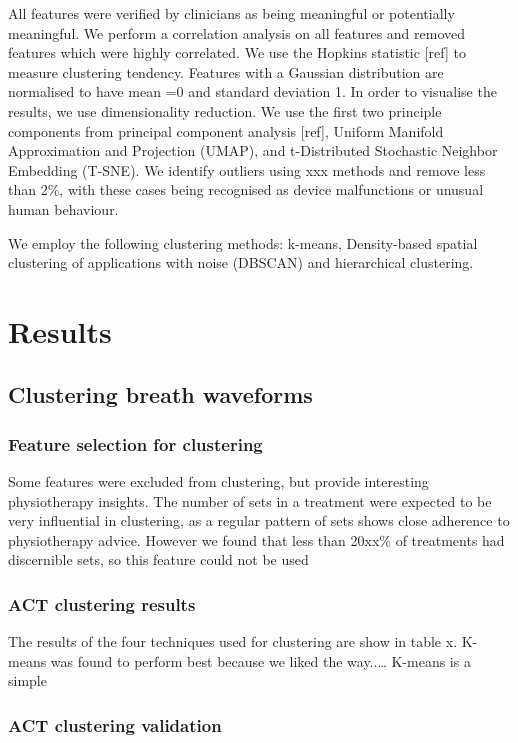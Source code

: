 \documentclass{article}
\begin{document}
All features were verified by clinicians as being meaningful or potentially meaningful. We perform a correlation analysis on all features and removed features which were highly correlated. We use the Hopkins statistic [ref] to measure clustering tendency. Features with a Gaussian distribution are normalised to have mean =0 and standard deviation 1. In order to visualise the results, we use dimensionality reduction. We use the first two principle components from principal component analysis [ref], Uniform Manifold Approximation and Projection (UMAP), and t-Distributed Stochastic Neighbor Embedding (T-SNE). We identify outliers using xxx methods and remove less than 2\%, with these cases being recognised as device malfunctions or unusual human behaviour.  

We employ the following clustering methods: k-means, Density-based spatial clustering of applications with noise (DBSCAN) and hierarchical clustering.  

\section{Results}
\subsection{Clustering breath waveforms}
\subsubsection{Feature selection for clustering}
Some features were excluded from clustering, but provide interesting physiotherapy insights.  
The number of sets in a treatment were expected to be very influential in clustering, as a regular pattern of sets shows close adherence to physiotherapy advice. However we found that less than 20xx\% of treatments had discernible sets, so this feature could not be used


\subsubsection{ACT clustering results}
The results of the four techniques used for clustering are show in table x. K-means was found to perform best because we liked the way..… K-means is a simple 


\subsubsection{ACT clustering validation}
\end{document}
